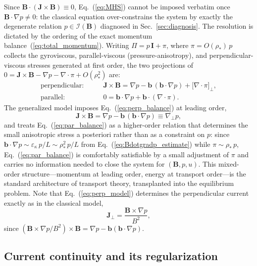 \documentclass[english]{article}
\newcommand{\bB}{\mathbf{B}}
\newcommand{\bJ}{\mathbf{J}}
\newcommand{\bb}{\mathbf{b}}
\newcommand{\bI}{\mathbf{I}}
\newcommand{\gradperp}{\nabla_{\!\perp}}
\begin{document}
Since $\bB\cdot(\bJ\times\bB)\equiv0$, Eq.~(\ref{eq:MHS}) cannot be imposed verbatim once
$\bB\cdot\nabla p\ne0$: the classical equation over-constrains the system by exactly the degenerate
relation $p\in\mathcal{I}(\bB)$ diagnosed in Sec.~\ref{sec:diagnosis}. The resolution is dictated
by the ordering of the exact momentum balance~(\ref{eq:total_momentum}). Writing
$\Pi=p\,\bI+\pi$, where $\pi=O(\rho_*)\,p$ collects the gyroviscous, parallel-viscous
(pressure-anisotropy), and perpendicular-viscous stresses generated at first order,
the two projections of $0=\bJ\times\bB-\nabla p-\nabla\cdot\pi+O(\rho_*^{2})$ are:
\begin{align}
\text{perpendicular:}\qquad &
\bJ\times\bB=\nabla p-\bb\,(\bb\cdot\nabla p)
+\big[\nabla\cdot\pi\big]_\perp ,
\label{eq:perp_balance}\\
\text{parallel:}\qquad &
0=\bb\cdot\nabla p+\bb\cdot(\nabla\cdot\pi) .
\label{eq:par_balance}
\end{align}
The generalized model imposes Eq.~(\ref{eq:perp_balance}) at leading order,
\begin{equation}
\bJ\times\bB=\nabla p-\bb\,(\bb\cdot\nabla p)\equiv\gradperp p ,
\label{eq:perp_model}
\end{equation}
and treats Eq.~(\ref{eq:par_balance}) as a higher-order relation that determines the small
anisotropic stress a posteriori rather than as a constraint on $p$: since
$\bb\cdot\nabla p\sim\varepsilon_\kappa\,p/L\sim\rho_*^{2}\,p/L$ from
Eq.~(\ref{eq:Bdotgradp_estimate}) while $\pi\sim\rho_*\,p$, Eq.~(\ref{eq:par_balance}) is
comfortably satisfiable by a small adjustment of $\pi$ and carries no information needed to close
the system for $(\bB,p,u)$. This mixed-order structure---momentum at leading order, energy at
transport order---is the standard architecture of transport theory, transplanted into the
equilibrium problem. Note that Eq.~(\ref{eq:perp_model}) determines the perpendicular current
exactly as in the classical model,
\begin{equation}
\bJ_\perp=\frac{\bB\times\nabla p}{B^{2}} ,
\label{eq:Jperp}
\end{equation}
since $(\bB\times\nabla p/B^{2})\times\bB=\nabla p-\bb(\bb\cdot\nabla p)$.

\subsection{Current continuity and its regularization}
\label{sec:current}
\end{document}
